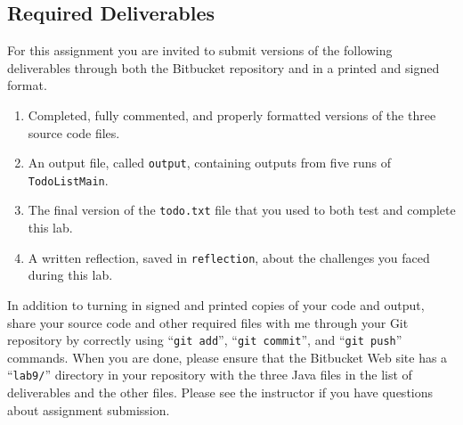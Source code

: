 
\vspace{-0.3in}
\subsection*{Required Deliverables}
\vspace{-0.05in}

For this assignment you are invited to submit versions of the following deliverables through both the Bitbucket
repository and in a printed and signed format.

\vspace{-0.1in}
\begin{enumerate}
    \setlength{\itemsep}{0pt}

  \item Completed, fully commented, and properly formatted versions of the three source code files.
  \item An output file, called {\tt output}, containing outputs from five runs of {\tt TodoListMain}.
  \item The final version of the {\tt todo.txt} file that you used to both test and complete this lab.
  \item A written reflection, saved in {\tt reflection}, about the challenges you faced during this lab.

\end{enumerate}
\vspace{-0.1in}

In addition to turning in signed and printed copies of your code and output, share your source code and other required
files with me through your Git repository by correctly using ``{\tt git add}'', ``{\tt git commit}'', and ``{\tt git
  push}'' commands. When you are done, please ensure that the Bitbucket Web site has a ``{\tt lab9/}'' directory in your
repository with the three Java files in the list of deliverables and the other files. Please see the instructor if
you have questions about assignment submission.


